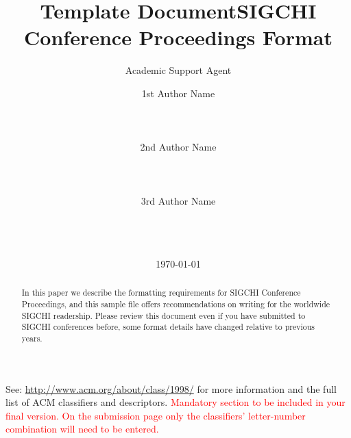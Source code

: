 \documentclass{article}
\title{Template Document}
\author{Academic Support Agent}
\date{\today}
\begin{document}
\maketitle

\title{SIGCHI Conference Proceedings Format}

\author{
  \alignauthor 1st Author Name\\
    \\
    \\
    \\
  \alignauthor 2nd Author Name\\
    \\
    \\
    \\
  \alignauthor 3rd Author Name\\
    \\
    \\
    \\
}

\maketitle

\begin{abstract}
In this paper we describe the formatting requirements for
SIGCHI Conference Proceedings, and this sample file
offers recommendations on writing for the worldwide
SIGCHI readership. Please review this document even if
you have submitted to SIGCHI conferences before, some
format details have changed relative to previous years.
\end{abstract}



See: \url{http://www.acm.org/about/class/1998/}
for more information and the full list of ACM classifiers
and descriptors. 
\textcolor{red}{Mandatory section to be included in your
final version. On the submission page only the classifiers'
letter-number combination will need to be entered.}
\end{document}
